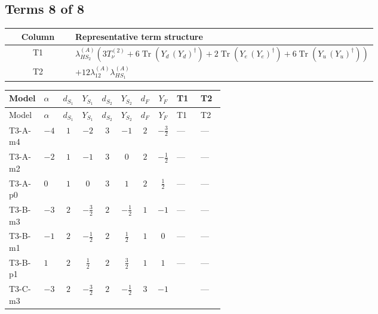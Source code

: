 \documentclass[8pt]{article}
\begin{document}
\begin{landscape}
\subsection*{Terms 8 of 8}
\begin{center}
\begin{tabular}{@{}c >{\raggedright\arraybackslash}p{0.82\linewidth}@{}}
\toprule
Column & Representative term structure \\
\midrule
T1 & \(\displaystyle {\lambda_{HS_2}^{(A)}} (3 T_{\nu}^{(2)}+6 \operatorname{Tr}\!\left({Y_d}\,\left({Y_d}\right)^{\dagger}\right)+2 \operatorname{Tr}\!\left({Y_e}\,\left({Y_e}\right)^{\dagger}\right)+6 \operatorname{Tr}\!\left({Y_u}\,\left({Y_u}\right)^{\dagger}\right))\) \\
\midrule
T2 & \(\displaystyle +12 {\lambda_{12}^{(A)}} {\lambda_{HS_1}^{(A)}}\) \\
\midrule
\bottomrule
\end{tabular}
\end{center}
\smallskip
\tiny
\begin{longtable}{@{}llcccccc >{\raggedright\arraybackslash}p{0.21\linewidth} >{\raggedright\arraybackslash}p{0.21\linewidth}@{}}
\toprule
Model & $\alpha$ & $d_{S_1}$ & $Y_{S_1}$ & $d_{S_2}$ & $Y_{S_2}$ & $d_F$ & $Y_F$ & T1 & T2 \\
\midrule
\endfirsthead
\toprule
Model & $\alpha$ & $d_{S_1}$ & $Y_{S_1}$ & $d_{S_2}$ & $Y_{S_2}$ & $d_F$ & $Y_F$ & T1 & T2 \\
\midrule
\endhead
T3-A-m4 & $-4$ & $1$ & $-2$ & $3$ & $-1$ & $2$ & $-\frac{3}{2}$ & --- & --- \\
\midrule
T3-A-m2 & $-2$ & $1$ & $-1$ & $3$ & $0$ & $2$ & $-\frac{1}{2}$ & --- & --- \\
\midrule
T3-A-p0 & $0$ & $1$ & $0$ & $3$ & $1$ & $2$ & $\frac{1}{2}$ & --- & --- \\
\midrule
T3-B-m3 & $-3$ & $2$ & $-\frac{3}{2}$ & $2$ & $-\frac{1}{2}$ & $1$ & $-1$ & --- & --- \\
\midrule
T3-B-m1 & $-1$ & $2$ & $-\frac{1}{2}$ & $2$ & $\frac{1}{2}$ & $1$ & $0$ & --- & --- \\
\midrule
T3-B-p1 & $1$ & $2$ & $\frac{1}{2}$ & $2$ & $\frac{3}{2}$ & $1$ & $1$ & --- & --- \\
\midrule
T3-C-m3 & $-3$ & $2$ & $-\frac{3}{2}$ & $2$ & $-\frac{1}{2}$ & $3$ & $-1$ & \scriptsize\adjustbox{max width=\linewidth}{$\begin{gathered} {\lambda_{HS_2}^{(A)}} (3 T_{\nu}^{(2)}+6 \operatorname{Tr}\!\left({Y_d}\,\left({Y_d}\right)^{\dagger}\right)+2 \operatorname{Tr}\!\left({Y_e}\,\left({Y_e}\right)^{\dagger}\right)+6 \operatorname{Tr}\!\left({Y_u}\,\left({Y_u}\right)^{\dagger}\right))\end{gathered}$} & --- \\

\end{longtable}
\end{landscape}
\end{document}
